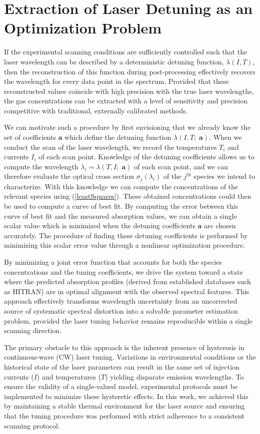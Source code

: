 \documentclass[12pt]{report}
\begin{document}
	\section{Extraction of Laser Detuning as an Optimization Problem}
	If the experimental scanning conditions are sufficiently controlled such that the laser wavelength can be described by a deterministic detuning function, $\lambda(I, T)$, then the reconstruction of this function during post-processing effectively recovers the wavelength for every data point in the spectrum. Provided that these reconstructed values coincide with high precision with the true laser wavelengths, the gas concentrations can be extracted with a level of sensitivity and precision competitive with traditional, externally calibrated methods.
	
	We can motivate such a procedure by first envisioning that we already know the set of coefficients $\mathbf{a}$ which define the detuning function $\lambda(I, T;\;\mathbf{a})$. When we conduct the scan of the laser wavelength, we record the temperatures $T_i$ and currents $I_i$ of each scan point. Knowledge of the detuning coefficients allows us to compute the wavelength $\lambda_i = \lambda(T, I;\; \mathbf{a})$ of each scan point, and we can therefore evaluate the optical cross section $\sigma_j(\lambda_i)$ of the $j^\mathrm{th}$ species we intend to characterize. With this knowledge we can compute the concentrations of the relevant species using (\ref{leastSquares}). These obtained concentrations could then be used to compute a curve of best fit. By computing the error between this curve of best fit and the measured absorption values, we can obtain a single scalar value which is minimized when the detuning coefficients $\mathbf{a}$ are chosen accurately. The procedure of finding these detuning coefficients is performed by minimizing this scalar error value through a nonlinear optimization procedure.
	
	By minimizing a joint error function that accounts for both the species concentrations and the tuning coefficients, we drive the system toward a state where the predicted absorption profiles (derived from established databases such as HITRAN) are in optimal alignment with the observed spectral features. This approach effectively transforms wavelength uncertainty from an uncorrected source of systematic spectral distortion into a solvable parameter estimation problem, provided the laser tuning behavior remains reproducible within a single scanning direction.
	
	The primary obstacle to this approach is the inherent presence of hysteresis in continuous-wave (CW) laser tuning. Variations in environmental conditions or the historical state of the laser parameters can result in the same set of injection currents ($I$) and temperatures ($T$) yielding disparate emission wavelengths. To ensure the validity of a single-valued model, experimental protocols must be implemented to minimize these hysteretic effects. In this work, we achieved this by maintaining a stable thermal environment for the laser source and ensuring that the tuning procedure was performed with strict adherence to a consistent scanning protocol.
	
\end{document}
